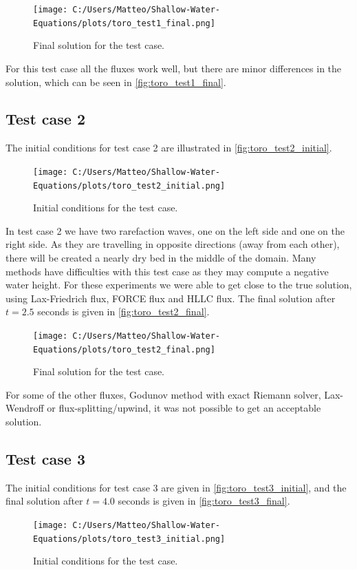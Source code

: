 \begin{figure}[H]
    \centering
    \texttt{[image: C:/Users/Matteo/Shallow-Water-Equations/plots/toro\_test1\_final.png]}
    \caption{Final solution for the test case.}\label{fig:toro_test1_final}
\end{figure}
For this test case all the fluxes work well, but there are minor differences in the solution, which can be seen in \autoref{fig:toro_test1_final}.

\subsection*{Test case 2}
The initial conditions for test case 2 are illustrated in \autoref{fig:toro_test2_initial}.
\begin{figure}[H]
    \centering
    \texttt{[image: C:/Users/Matteo/Shallow-Water-Equations/plots/toro\_test2\_initial.png]}
    \caption{Initial conditions for the test case.}\label{fig:toro_test2_initial}
\end{figure}
In test case 2 we have two rarefaction waves, one on the left side and one on the right side.
As they are travelling in opposite directions (away from each other), there will be created a nearly dry bed in the middle of the domain.
Many methods have difficulties with this test case as they may compute a negative water height.
For these experiments we were able to get close to the true solution, using Lax-Friedrich flux, FORCE flux and HLLC flux.
The final solution after $t=2.5$ seconds is given in \autoref{fig:toro_test2_final}.

\begin{figure}[H]
    \centering
    \texttt{[image: C:/Users/Matteo/Shallow-Water-Equations/plots/toro\_test2\_final.png]}
    \caption{Final solution for the test case.}\label{fig:toro_test2_final}
\end{figure}
For some of the other fluxes, Godunov method with exact Riemann solver, Lax-Wendroff or flux-splitting/upwind, it was not possible to get an acceptable solution.

\subsection*{Test case 3}
The initial conditions for test case 3 are given in \autoref{fig:toro_test3_initial}, and the final solution after $t=4.0$ seconds is given in \autoref{fig:toro_test3_final}.
\begin{figure}[H]
    \centering
    \texttt{[image: C:/Users/Matteo/Shallow-Water-Equations/plots/toro\_test3\_initial.png]}
    \caption{Initial conditions for the test case.}\label{fig:toro_test3_initial}
\end{figure}

